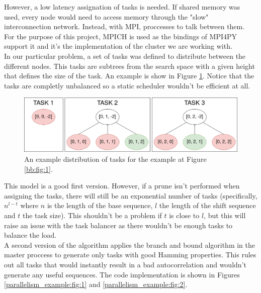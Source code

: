   However, a low latency assignation of tasks is needed. If shared
  memory was used, every node would need to access memory through the "slow"
  interconnection network. Instead, with MPI, proccesses to talk between them.\\

  For the purpose of this project, MPICH\cite{mpich} is used as the bindings of
  MPI4PY support it and it's the implementation of the cluster we are working
  with\cite{calderon}.\\

  In our particular problem, a set of tasks was defined to
  distribute between the different nodes. This tasks are subtrees from the
  search space with a given height that defines the size of the task. An
  example is show in Figure \ref{tasks:fig:1}. Notice that the tasks are
  completly unbalanced so a static scheduler wouldn't be efficient at all.\\


  \begin{figure}[ht!]
    \begin{center}
      \includegraphics[scale=0.4]{Chapters/Implementation/Example_tasks.png}
    \end{center}
    \caption{An example distribution of tasks for the example at Figure
    \ref{bb:fig:1}.}
    \label{tasks:fig:1}
  \end{figure}

  This model is a good first version. However, if a prune isn't performed when
  assigning the tasks, there will still be an exponential number of tasks
  (specifically, $n^{l-t}$ where $n$ is the length of the base sequence, $l$ the
  length of the shift sequence and $t$ the task size). This shouldn't be a problem
  if $t$ is close to $l$, but this will raise an issue with the task balancer as
  there wouldn't be enough tasks to balance the load.\\

  A second version of the algorithm applies the branch and bound algorithm in
  the master proccess to generate only tasks with good Hamming properties.
  This rules out all tasks that would instantly result in a bad
  autocorrelation and wouldn't generate any useful sequences. The code
  implementation is shown in Figures \ref{parallelism_example:fig:1} and
  \ref{parallelism_example:fig:2}.\\

